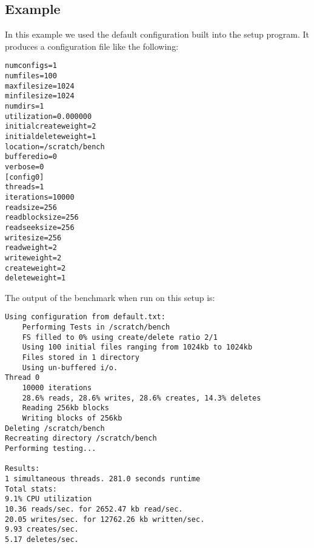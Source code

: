 \documentclass[twocolumn]{article}
\begin{document}
\subsection{Example}

In this example we used the default configuration built into the setup
program. It produces a configuration file like the following:
\begin{verbatim}
numconfigs=1
numfiles=100
maxfilesize=1024
minfilesize=1024
numdirs=1
utilization=0.000000
initialcreateweight=2
initialdeleteweight=1
location=/scratch/bench
bufferedio=0
verbose=0
[config0]
threads=1
iterations=10000
readsize=256
readblocksize=256
readseeksize=256
writesize=256
readweight=2
writeweight=2
createweight=2
deleteweight=1
\end{verbatim}
The output of the benchmark when run on this setup is:
\begin{verbatim}
Using configuration from default.txt:
	Performing Tests in /scratch/bench
	FS filled to 0% using create/delete ratio 2/1
	Using 100 initial files ranging from 1024kb to 1024kb
	Files stored in 1 directory
	Using un-buffered i/o.
Thread 0
	10000 iterations
	28.6% reads, 28.6% writes, 28.6% creates, 14.3% deletes
	Reading 256kb blocks
	Writing blocks of 256kb
Deleting /scratch/bench
Recreating directory /scratch/bench
Performing testing...

Results:
1 simultaneous threads. 281.0 seconds runtime
Total stats:
9.1% CPU utilization
10.36 reads/sec. for 2652.47 kb read/sec.
20.05 writes/sec. for 12762.26 kb written/sec.
9.93 creates/sec.
5.17 deletes/sec.
\end{verbatim}
\end{document}
